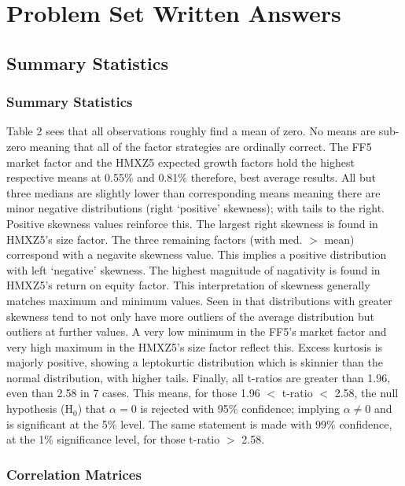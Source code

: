 \documentclass[11pt, english]{article}
\begin{document}
\newpage


\section{Problem Set Written Answers}

	\subsection{Summary Statistics}

		\subsubsection{Summary Statistics}

	Table 2 sees that all observations roughly find a mean of zero. No means are sub-zero meaning that all of the factor strategies are ordinally correct. The FF5 market factor and the HMXZ5 expected growth factors hold the highest respective means at 0.55\% and 0.81\% therefore, best average results. All but three medians are slightly lower than corresponding means meaning there are minor negative distributions (right `positive' skewness); with tails to the right. Positive skewness values reinforce this. The largest right skewness is found in HMXZ5's size factor. The three remaining factors (with med. $>$ mean) correspond with a negavite skewness value. This implies a positive distribution with left `negative' skewness. The highest magnitude of nagativity is found in HMXZ5's return on equity factor. This interpretation of skewness generally matches maximum and minimum values. Seen in that distributions with greater skewness tend to not only have more outliers of the average distribution but outliers at further values. A very low minimum in the FF5's market factor and very high maximum in the HMXZ5's size factor reflect this. Excess kurtosis is majorly positive, showing a leptokurtic distribution which is skinnier than the normal distribution, with higher tails. Finally, all t-ratios are greater than 1.96, even than 2.58 in 7 cases. This means, for those 1.96 $\mathrm{<}$ t-ratio $\mathrm{<}$ 2.58, the null hypothesis (H$_0$) that $\alpha=0$ is rejected with 95\% confidence; implying $\alpha\neq 0$ and is significant at the 5\% level. The same statement is made with 99\% confidence, at the 1\% significance level, for those t-ratio $\mathrm{>}$ 2.58.

		\subsubsection{Correlation Matrices}
\end{document}
